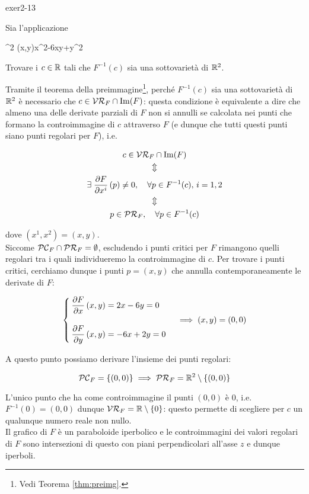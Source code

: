 {exer2-13}
{
Sia l'applicazione

	{\R^{2}}{\R}
	{(x,y)}{x^{2}-6xy+y^{2}}

Trovare i $ c \in \mathbb{R} $ tali che $ F^{-1}(c) $ sia una sottovarietà di $ \mathbb{R}^{2} $.
}
{
Tramite il teorema della preimmagine\footnote{%
	Vedi Teorema \ref{thm:preimg}.%
}, perché $ F^{-1}(c) $ sia una sottovarietà di $ \mathbb{R}^{2} $ è necessario che $ c \in \mathcal{VR}_{F} \cap \Im(F) $: questa condizione è equivalente a dire che almeno una delle derivate parziali di $ F $ non si annulli se calcolata nei punti che formano la controimmagine di $ c $ attraverso $ F $ (e dunque che tutti questi punti siano punti regolari per $ F $), i.e.

\begin{gather}
	c \in \VR_{F} \cap \Im(F) \nonumber \\
	\Updownarrow \nonumber \\
	\E \pdv{F}{x^{i}} \, (p) \neq 0 \qcomma \forall p \in F^{-1}(c), \, i=1,2 \\
	\Updownarrow \nonumber \\
	p \in \PR_{F} \qcomma \forall p \in F^{-1}(c) \nonumber
\end{gather}

dove $ (x^{1},x^{2}) = (x,y) $. \\
Siccome $ \mathcal{PC}_{F} \cap \mathcal{PR}_{F} = \emptyset $, escludendo i punti critici per $ F $ rimangono quelli regolari tra i quali individueremo la controimmagine di $ c $. Per trovare i punti critici, cerchiamo dunque i punti $ p = (x,y) $ che annulla contemporaneamente le derivate di $ F $:

\begin{equation}
	\begin{cases}
		\dpdv{F}{x} \, (x,y) = 2 x - 6 y = 0 \\ \\
		\dpdv{F}{y} \, (x,y) = - 6 x + 2 y = 0
	\end{cases} %
	\implies %
	(x,y) = (0,0)
\end{equation}

A questo punto possiamo derivare l'insieme dei punti regolari:

\begin{equation}
	\PC_{F} = \{(0,0)\} %
	\implies %
	\PR_{F} = \R^{2} \setminus \{(0,0)\}
\end{equation}

L'unico punto che ha come controimmagine il punti $ (0,0) $ è $ 0 $, i.e. $ F^{-1}(0) = (0,0) $ dunque $ \mathcal{VR}_{F} = \mathbb{R} \setminus \{0\} $: questo permette di scegliere per $ c $ un qualunque numero reale non nullo. \\
Il grafico di $ F $ è un paraboloide iperbolico e le controimmagini dei valori regolari di $ F $ sono intersezioni di questo con piani perpendicolari all'asse $ z $ e dunque iperboli.
}

